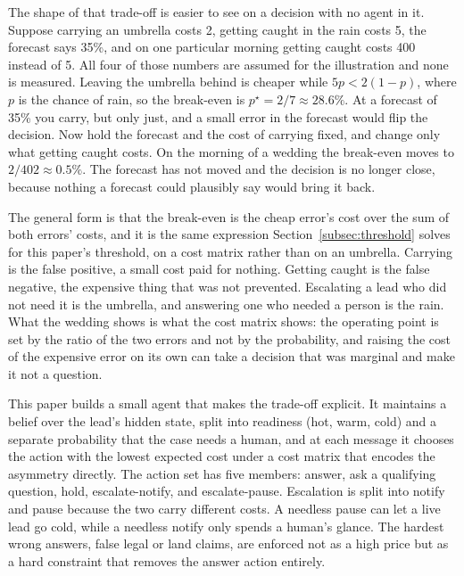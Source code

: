 \documentclass{article}
\begin{document}
The shape of that trade-off is easier to see on a decision with no agent in it.
Suppose carrying an umbrella costs 2, getting caught in the rain costs 5, the
forecast says 35\%, and on one particular morning getting caught costs 400 instead
of 5. All four of those numbers are assumed for the illustration and none is
measured. Leaving the umbrella behind is cheaper while $5p < 2(1-p)$, where $p$ is
the chance of rain, so the break-even is $p^{\star} = 2/7 \approx 28.6\%$. At a
forecast of 35\% you carry, but only just, and a small error in the forecast would
flip the decision. Now hold the forecast and the cost of carrying fixed, and change
only what getting caught costs. On the morning of a wedding the break-even moves to
$2/402 \approx 0.5\%$. The forecast has not moved and the decision is no longer
close, because nothing a forecast could plausibly say would bring it back.

The general form is that the break-even is the cheap error's cost over the sum of
both errors' costs, and it is the same expression
Section~\ref{subsec:threshold} solves for
this paper's threshold, on a cost matrix rather than on an umbrella. Carrying is the
false positive, a small cost paid for nothing. Getting caught is the false negative,
the expensive thing that was not prevented. Escalating a lead who did not need it is
the umbrella, and answering one who needed a person is the rain. What the wedding
shows is what the cost matrix shows: the operating point is set by the ratio of the
two errors and not by the probability, and raising the cost of the expensive error
on its own can take a decision that was marginal and make it not a question.

This paper builds a small agent that makes the trade-off explicit. It maintains
a belief over the lead's hidden state, split into readiness (hot, warm, cold)
and a separate probability that the case needs a human, and at each message it
chooses the action with the lowest expected cost under a cost matrix that
encodes the asymmetry directly. The action set has five members: answer, ask a
qualifying question, hold, escalate-notify, and escalate-pause. Escalation is
split into notify and pause because the two carry different costs. A needless
pause can let a live lead go cold, while a needless notify only spends a human's
glance. The hardest wrong answers, false legal or land claims, are enforced not
as a high price but as a hard constraint that removes the answer action
entirely.
\end{document}
